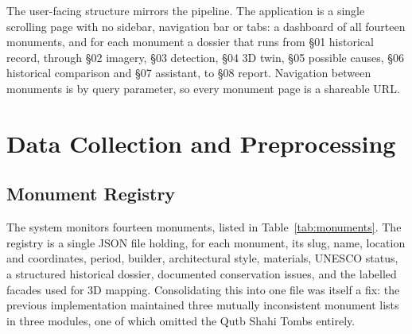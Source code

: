 \documentclass[a4paper,12pt,oneside]{book}
\begin{document}
The user-facing structure mirrors the pipeline. The application is a single scrolling page with no sidebar, navigation bar or tabs: a dashboard of all fourteen monuments, and for each monument a dossier that runs from \S01 historical record, through \S02 imagery, \S03 detection, \S04 3D twin, \S05 possible causes, \S06 historical comparison and \S07 assistant, to \S08 report. Navigation between monuments is by query parameter, so every monument page is a shareable URL.

\section{Data Collection and Preprocessing}

\subsection{Monument Registry}
The system monitors fourteen monuments, listed in Table~\ref{tab:monuments}. The registry is a single JSON file holding, for each monument, its slug, name, location and coordinates, period, builder, architectural style, materials, UNESCO status, a structured historical dossier, documented conservation issues, and the labelled facades used for 3D mapping. Consolidating this into one file was itself a fix: the previous implementation maintained three mutually inconsistent monument lists in three modules, one of which omitted the Qutb Shahi Tombs entirely.
\end{document}
